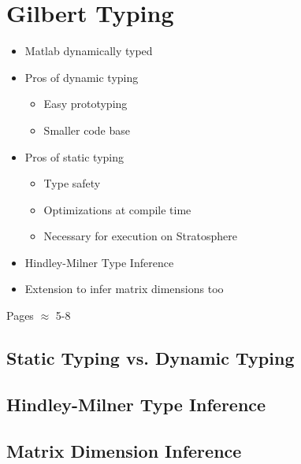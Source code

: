 \chapter{Gilbert Typing}
\label{cha:gilberttyping}

\begin{itemize}
	\item Matlab dynamically typed
	\item Pros of dynamic typing
	\begin{itemize}
		\item Easy prototyping
		\item Smaller code base
	\end{itemize}
	\item Pros of static typing
	\begin{itemize}
		\item Type safety
		\item Optimizations at compile time
		\item Necessary for execution on Stratosphere
	\end{itemize}
	\item Hindley-Milner Type Inference
	\item Extension to infer matrix dimensions too
\end{itemize}

Pages $\approx$ 5-8

\section{Static Typing vs. Dynamic Typing}

\section{Hindley-Milner Type Inference}

\section{Matrix Dimension Inference}